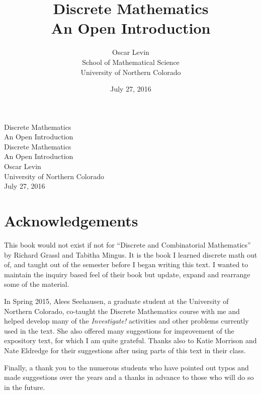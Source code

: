 \documentclass[10pt,]{book}
\title{Discrete Mathematics\\
{\large An Open Introduction}}
\author{Oscar Levin\\
School of Mathematical Science\\
University of Northern Colorado
}
\date{July 27, 2016}
\theoremstyle{plain}
\theoremstyle{definition}
\theoremstyle{definition}
\theoremstyle{definition}
\numberwithin{equation}{section}
\begin{document}
\frontmatter
\thispagestyle{empty}
{\centering
\vspace*{0.28\textheight}
{\Huge Discrete Mathematics}\\[2\baselineskip]
{\LARGE An Open Introduction}\\
}
\clearpage
\thispagestyle{empty}
\null%
\clearpage
\thispagestyle{empty}
{\centering
\vspace*{0.14\textheight}
{\Huge Discrete Mathematics}\\[\baselineskip]
{\LARGE An Open Introduction}\\[3\baselineskip]
{\Large Oscar Levin}\\[0.5\baselineskip]
{\Large University of Northern Colorado}\\[3\baselineskip]
{\Large July 27, 2016}\\}
\clearpage
\thispagestyle{empty}
\null\clearpage
\chapter*{Acknowledgements}\label{acknowledgement-1}

  This book would not exist if not for ``Discrete and Combinatorial Mathematics'' by Richard Grassl and Tabitha Mingus. It is the book I learned discrete math out of, and taught out of the semester before I began writing this text. I wanted to maintain the inquiry based feel of their book but update, expand and rearrange some of the material.
\par

  In Spring 2015, Alees Seehausen, a graduate student at the University of Northern Colorado, co-taught the Discrete Mathematics course with me and helped develop many of the \emph{Investigate!} activities and other problems currently used in the text. She also offered many suggestions for improvement of the expository text, for which I am quite grateful. Thanks also to Katie Morrison and Nate Eldredge for their suggestions after using parts of this text in their class.
\par

  Finally, a thank you to the numerous students who have pointed out typos and made suggestions over the years and a thanks in advance to those who will do so in the future.
\end{document}
